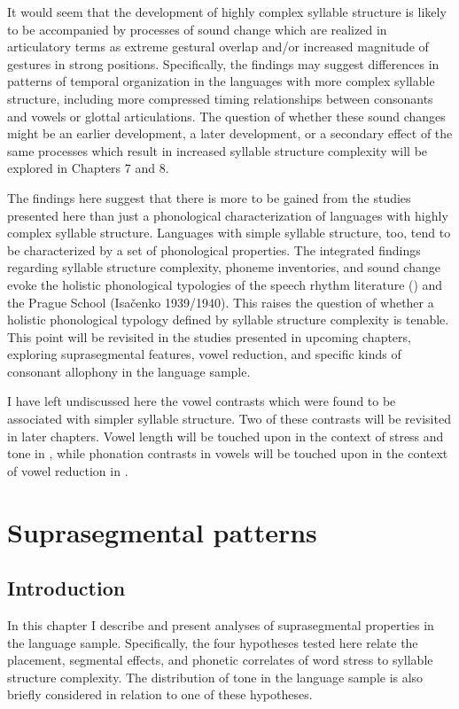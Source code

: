   It would seem that the development of highly complex syllable structure is likely to be accompanied by processes of sound change which are realized in articulatory terms as extreme gestural overlap and/or increased magnitude of gestures in strong positions. Specifically, the findings may suggest differences in patterns of temporal organization in the languages with more complex syllable structure, including more compressed timing relationships between consonants and vowels or glottal articulations. The question of whether these sound changes might be an earlier development, a later development, or a secondary effect of the same processes which result in increased syllable structure complexity will be explored in Chapters 7 and 8.

  The findings here suggest that there is more to be gained from the studies presented here than just a phonological characterization of languages with highly complex syllable structure. Languages with simple syllable structure, too, tend to be characterized by a set of phonological properties. The integrated findings regarding syllable structure complexity, phoneme inventories, and sound change evoke the holistic phonological typologies of the speech rhythm literature (\citealt{Roach1982,Dauer1983,Auer1993}) and the Prague School (Isačenko 1939/1940). This raises the question of whether a holistic phonological typology defined by syllable structure complexity is tenable. This point will be revisited in the studies presented in upcoming chapters, exploring suprasegmental features, vowel reduction, and specific kinds of consonant allophony in the language sample.

  I have left undiscussed here the vowel contrasts which were found to be associated with simpler syllable structure. Two of these contrasts will be revisited in later chapters. Vowel length will be touched upon in the context of stress and tone in , while phonation contrasts in vowels will be touched upon in the context of vowel reduction in .

\chapter{Suprasegmental patterns}\label{sec:5}
\section{{Introduction}}\label{sec:5.1}

  In this chapter I describe and present analyses of suprasegmental properties in the language sample. Specifically, the four hypotheses tested here relate the placement, segmental effects, and phonetic correlates of word stress to syllable structure complexity. The distribution of tone in the language sample is also briefly considered in relation to one of these hypotheses.

